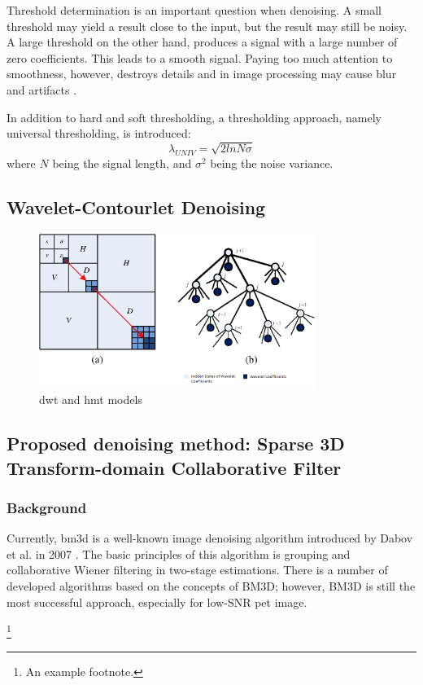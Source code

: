 Threshold determination is an important question when denoising. A small threshold
may yield a result close to the input, but the
result may still be noisy. A large threshold on the other hand, produces a signal with a large number
of zero coefficients. This leads to a smooth signal.
Paying too much attention to smoothness, however,
destroys details and in image processing may cause
blur and artifacts \cite{rangarajan2002image}.

In addition to hard and soft thresholding, a thresholding approach, namely universal thresholding, is introduced:
\begin{equation}
\lambda_{UNIV}=\sqrt{2lnN\sigma}
\end{equation}
where $N$ being the signal length, and $\sigma^2$ being the noise variance.


\subsection{Wavelet-Contourlet Denoising}

\begin{figure}[h]
	\centering
	\includegraphics[width=0.8\textwidth]{fig/wavelets_hmt}
	\caption{\glsdesc{dwt} and \glsdesc{hmt} models}
	\label{fig:wavelets_hmt}
\end{figure}



\subsection{Proposed denoising method: Sparse 3D Transform-domain Collaborative Filter}
\subsubsection*{Background}
Currently, \gls{bm3d} is a well-known
image denoising algorithm introduced by Dabov et al. in 2007 \cite{dabov2007image}. The basic principles
of this algorithm is grouping and collaborative Wiener filtering in two-stage
estimations. There is a number of developed algorithms based on the concepts of
BM3D; however, BM3D is still the most successful
approach, especially for low-SNR \gls{pet} image.

\citeauthor{dabov2007image}

\footnote{An example footnote.}